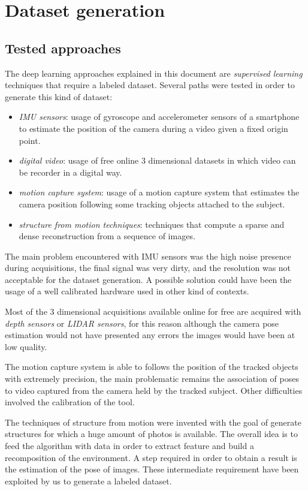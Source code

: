 \section{Dataset generation}
\subsection{Tested approaches}
The deep learning approaches explained in this document are \textit{supervised learning} techniques that require a labeled dataset. Several paths were tested in order to generate this kind of dataset:
\begin{itemize}
    \item \emph{IMU sensors}: usage of gyroscope and accelerometer sensors of a smartphone to estimate the position of the camera during a video given a fixed origin point. 
    \item \emph{digital video}: usage of free online 3 dimensional datasets in which video can be recorder in a digital way.
    \item \emph{motion capture system}: usage of a motion capture system that estimates the camera position following some tracking objects attached to the subject.
    \item \emph{structure from motion techniques}: techniques that compute a sparse and dense reconstruction from a sequence of images.
\end{itemize}

The main problem encountered with IMU sensors was the high noise presence during acquisitions, the final signal was very dirty, and the resolution was not acceptable for the dataset generation. A possible solution could have been the usage of a well calibrated hardware used in other kind of contexts.

Most of the 3 dimensional acquisitions available online for free are acquired with \emph{depth sensors} or \emph{LIDAR sensors}, for this reason although the camera pose estimation would not have presented any errors the images would have been at low quality.

The motion capture system is able to follows the position of the tracked objects with extremely precision, the main problematic remains the association of poses to video captured from the camera held by the tracked subject. Other difficulties involved the calibration of the tool.

The techniques of structure from motion were invented with the goal of generate structures for which a huge amount of photos is available. The overall idea is to feed the algorithm with data in order to extract feature and build a recomposition of the environment. A step required in order to obtain a result is the estimation of the pose of images. These intermediate requirement have been exploited by us to generate a labeled dataset.

